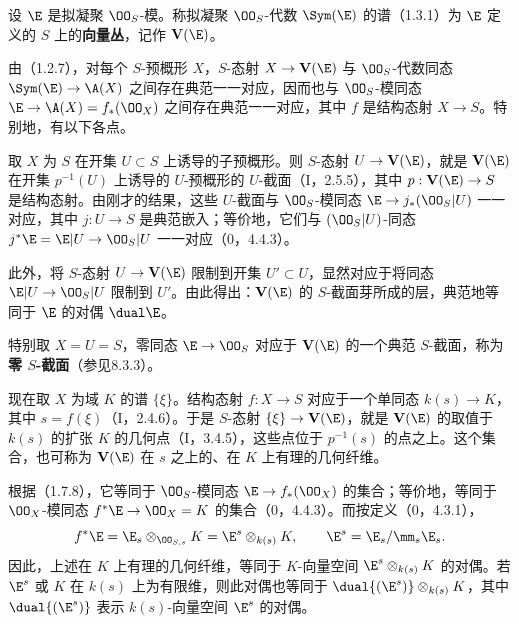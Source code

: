 设 $\E$ 是拟凝聚 $\OO_S$-模。称拟凝聚 $\OO_S$-代数 $\Sym(\E)$ 的谱（1.3.1）为 $\E$ 定义的 $S$ 上的\textbf{向量丛}，记作 $\mathbf V(\E)$。

由（1.2.7），对每个 $S$-预概形 $X$，$S$-态射 $X\to\mathbf V(\E)$ 与 $\OO_S$-代数同态 $\Sym(\E)\to\A(X)$ 之间存在典范一一对应，因而也与 $\OO_S$-模同态
$\E\to\A(X)=f_*(\OO_X)$ 之间存在典范一一对应，其中 $f$ 是结构态射 $X\to S$。特别地，有以下各点。

取 $X$ 为 $S$ 在开集 $U\subset S$ 上诱导的子预概形。则 $S$-态射 $U\to\mathbf V(\E)$，就是 $\mathbf V(\E)$ 在开集 $p^{-1}(U)$ 上诱导的 $U$-预概形的 $U$-截面（I，2.5.5），其中 $p:\mathbf V(\E)\to S$ 是结构态射。由刚才的结果，这些 $U$-截面与 $\OO_S$-模同态
$\E\to j_*(\OO_S|U)$ 一一对应，其中 $j:U\to S$ 是典范嵌入；等价地，它们与 $(\OO_S|U)$-同态
$j^*\E=\E|U\to\OO_S|U$ 一一对应（0，4.4.3）。

此外，将 $S$-态射 $U\to\mathbf V(\E)$ 限制到开集 $U'\subset U$，显然对应于将同态 $\E|U\to\OO_S|U$ 限制到 $U'$。由此得出：$\mathbf V(\E)$ 的 $S$-截面芽所成的层，典范地等同于 $\E$ 的对偶 $\dual\E$。

特别取 $X=U=S$，零同态 $\E\to\OO_S$ 对应于 $\mathbf V(\E)$ 的一个典范 $S$-截面，称为\textbf{零 $S$-截面}（参见8.3.3）。

现在取 $X$ 为域 $K$ 的谱 $\{\xi\}$。结构态射 $f:X\to S$ 对应于一个单同态 $k(s)\to K$，其中 $s=f(\xi)$（I，2.4.6）。于是 $S$-态射 $\{\xi\}\to\mathbf V(\E)$，就是 $\mathbf V(\E)$ 的取值于 $k(s)$ 的扩张 $K$ 的几何点（I，3.4.5），这些点位于 $p^{-1}(s)$ 的点之上。这个集合，也可称为 $\mathbf V(\E)$ 在 $s$ 之上的、在 $K$ 上有理的几何纤维。

根据（1.7.8），它等同于 $\OO_S$-模同态 $\E\to f_*(\OO_X)$ 的集合；等价地，等同于 $\OO_X$-模同态 $f^*\E\to\OO_X=K$ 的集合（0，4.4.3）。而按定义（0，4.3.1），
\[
f^*\E=\E_s\otimes_{\OO_{S,s}}K
=\E^s\otimes_{k(s)}K,\qquad \E^s=\E_s/\mm_s\E_s.
\]
因此，上述在 $K$ 上有理的几何纤维，等同于 $K$-向量空间 $\E^s\otimes_{k(s)}K$ 的对偶。若 $\E^s$ 或 $K$ 在 $k(s)$ 上为有限维，则此对偶也等同于
$\dual{(\E^s)}\otimes_{k(s)}K$，其中 $\dual{(\E^s)}$ 表示 $k(s)$-向量空间 $\E^s$ 的对偶。

